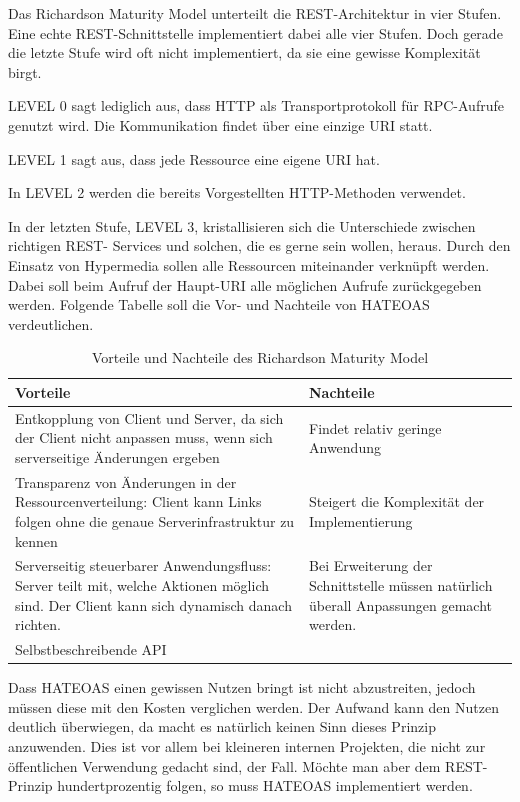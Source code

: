 Das Richardson Maturity Model unterteilt die \ac{REST}-Architektur in vier Stufen. Eine echte
\ac{REST}-Schnittstelle implementiert dabei alle vier Stufen. Doch gerade die letzte Stufe wird oft
nicht implementiert, da sie eine gewisse Komplexität birgt.

LEVEL 0 sagt lediglich aus, dass \ac{HTTP} als Transportprotokoll für RPC-Aufrufe genutzt wird.
Die Kommunikation findet über eine einzige \ac{URI} statt.

LEVEL 1 sagt aus, dass jede Ressource eine eigene \ac{URI} hat.

In LEVEL 2 werden die bereits Vorgestellten \ac{HTTP}-Methoden verwendet.

In der letzten Stufe, LEVEL 3, kristallisieren sich die Unterschiede zwischen richtigen \ac{REST}-
Services und solchen, die es gerne sein wollen, heraus. Durch den Einsatz von Hypermedia sollen alle
Ressourcen miteinander verknüpft werden. Dabei soll beim Aufruf der Haupt-\ac{URI} alle
möglichen Aufrufe zurückgegeben werden. Folgende Tabelle soll die Vor- und Nachteile von
HATEOAS verdeutlichen.
\newline

\begin{table}[H]
	\begin{tabular}{ | p{7cm} | p{7cm} | }	
		\hline	
		Vorteile & Nachteile \\  \hline	
		Entkopplung von Client und Server, da sich der Client nicht anpassen muss,
		wenn sich serverseitige Änderungen ergeben & 
		Findet relativ geringe Anwendung	 \\ \hline
		Transparenz von Änderungen in der Ressourcenverteilung: 
		Client kann Links folgen ohne die genaue Serverinfrastruktur zu kennen 
		& Steigert die Komplexität der Implementierung \\ \hline
		Serverseitig steuerbarer Anwendungsfluss: Server teilt mit, welche Aktionen möglich sind. 
		Der Client kann sich dynamisch danach richten.
		 & Bei Erweiterung der Schnittstelle müssen natürlich überall Anpassungen gemacht werden. \\ \hline
		Selbstbeschreibende API &  \\ \hline
	\end{tabular}
	\caption{Vorteile und Nachteile des Richardson Maturity Model}
\end{table}

Dass HATEOAS einen gewissen Nutzen bringt ist nicht abzustreiten, jedoch müssen diese mit den Kosten verglichen werden. Der Aufwand kann den Nutzen deutlich überwiegen, da macht es natürlich keinen Sinn dieses Prinzip anzuwenden. Dies ist vor allem bei kleineren internen Projekten, die nicht zur öffentlichen Verwendung gedacht sind, der Fall. Möchte man aber dem \ac{REST}-Prinzip hundertprozentig folgen, so muss HATEOAS implementiert werden.
